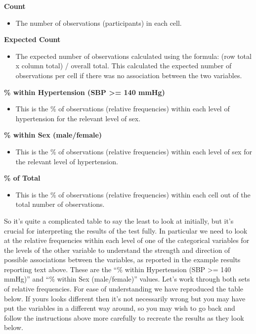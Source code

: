 \documentclass[
]{book}
\providecommand{\tightlist}{%
  \setlength{\itemsep}{0pt}\setlength{\parskip}{0pt}}
\begin{document}
\textbf{Count}

\begin{itemize}
\tightlist
\item
  The number of observations (participants) in each cell.
\end{itemize}

\textbf{Expected Count}

\begin{itemize}
\tightlist
\item
  The expected number of observations calculated using the formula: (row total x column total) / overall total. This calculated the expected number of observations per cell if there was no association between the two variables.
\end{itemize}

\textbf{\% within Hypertension (SBP \textgreater= 140 mmHg)}

\begin{itemize}
\tightlist
\item
  This is the \% of observations (relative frequencies) within each level of hypertension for the relevant level of sex.
\end{itemize}

\textbf{\% within Sex (male/female)}

\begin{itemize}
\tightlist
\item
  This is the \% of observations (relative frequencies) within each level of sex for the relevant level of hypertension.
\end{itemize}

\textbf{\% of Total}

\begin{itemize}
\tightlist
\item
  This is the \% of observations (relative frequencies) within each cell out of the total number of observations.
\end{itemize}

So it's quite a complicated table to say the least to look at initially, but it's crucial for interpreting the results of the test fully. In particular we need to look at the relative frequencies within each level of one of the categorical variables for the levels of the other variable to understand the strength and direction of possible associations between the variables, as reported in the example results reporting text above. These are the ``\% within Hypertension (SBP \textgreater= 140 mmHg)'' and ``\% within Sex (male/female)'' values. Let's work through both sets of relative frequencies. For ease of understanding we have reproduced the table below. If yours looks different then it's not necessarily wrong but you may have put the variables in a different way around, so you may wish to go back and follow the instructions above more carefully to recreate the results as they look below.
\end{document}
